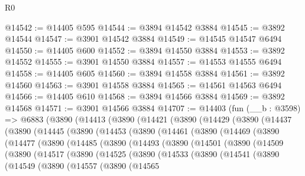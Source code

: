 \begin{lexlean}{R0}
\begin{coremodule}
@14542 := @14405 @595
@14544 := @3894 @14542 @3884
@14545 := @3892 @14544
@14547 := @3901 @14542 @3884
@14549 := @14545 @14547 @6494
@14550 := @14405 @600
@14552 := @3894 @14550 @3884
@14553 := @3892 @14552
@14555 := @3901 @14550 @3884
@14557 := @14553 @14555 @6494
@14558 := @14405 @605
@14560 := @3894 @14558 @3884
@14561 := @3892 @14560
@14563 := @3901 @14558 @3884
@14565 := @14561 @14563 @6494
@14566 := @14405 @610
@14568 := @3894 @14566 @3884
@14569 := @3892 @14568
@14571 := @3901 @14566 @3884
@14707 := @14403
    (fun (__b : @3598) =>
    @6883
      (@3890
        (@14413
          (@3890
            (@14421
              (@3890
                (@14429
                  (@3890
                    (@14437
                      (@3890
                        (@14445
                          (@3890
                            (@14453
                              (@3890
                                (@14461
                                  (@3890
                                    (@14469
                                      (@3890
                                        (@14477
                                          (@3890
                                            (@14485
                                              (@3890
                                                (@14493
                                                  (@3890
                                                    (@14501
                                                      (@3890
                                                        (@14509
                                                          (@3890
                                                            (@14517
                                                              (@3890
                                                                (@14525
                                                                  (@3890
                                                                    (@14533
                                                                      (@3890
                                                                        (@14541
                                                                          (@3890
                                                                            (@14549
                                                                              (@3890
                                                                                (@14557
                                                                                  (@3890
                                                                                    (@14565

\end{coremodule}
\end{lexlean}
